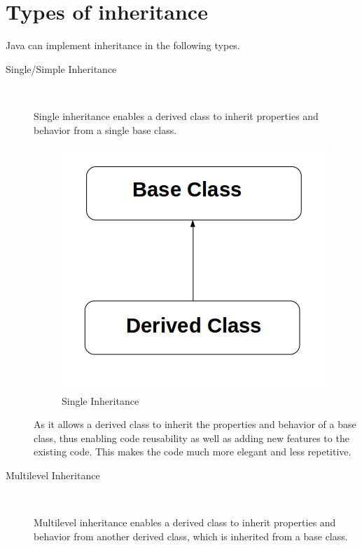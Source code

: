 \documentclass[11pt,a4paper]{article}
\begin{document}
\section*{Types of inheritance}
Java can implement inheritance in the following types.
 
\begin{description}
\item[Single/Simple Inheritance]\
  
Single inheritance enables a derived class to inherit properties and behavior from a single base class.
     
 \begin{figure}[H] 
 \begin{center}
 \includegraphics[scale=.5]{single_inheritance.png}
   \caption{Single Inheritance}
 \end{center}
 \end{figure}
 
As it allows a derived class to inherit the properties and behavior of a base class, thus enabling code reusability as well as adding new features to the existing code. This makes the code much more elegant and less repetitive. 
\item[Multilevel Inheritance]\
  
Multilevel inheritance enables a derived class to inherit properties and behavior from another derived class, which is inherited from a base class.
   

\end{description}
\end{document}
